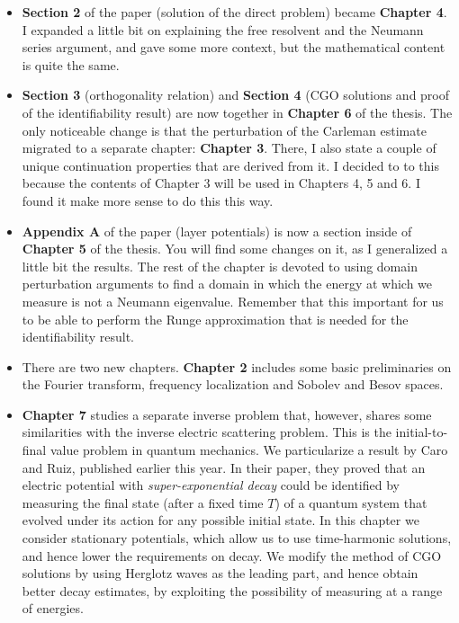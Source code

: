 \documentclass{article}
\begin{document}
\begin{itemize}
	\item \textbf{Section 2} of the paper (solution of the direct problem) became \textbf{Chapter 4}. I expanded a little bit on explaining the free resolvent and the Neumann series argument, and gave some more context, but the mathematical content is quite the same.
	\item \textbf{Section 3} (orthogonality relation) and \textbf{Section 4} (CGO solutions and proof of the identifiability result) are now together in \textbf{Chapter 6} of the thesis. The only noticeable change is that the perturbation of the Carleman estimate migrated to a separate chapter: \textbf{Chapter 3}. There, I also state a couple of unique continuation properties that are derived from it. I decided to to this because the contents of Chapter 3 will be used in Chapters 4, 5 and 6. I found it make more sense to do this this way.
	\item \textbf{Appendix A} of the paper (layer potentials) is now a section inside of \textbf{Chapter 5} of the thesis. You will find some changes on it, as I generalized a little bit the results. The rest of the chapter is devoted to using domain perturbation arguments to find a domain in which the energy at which we measure is not a Neumann eigenvalue. Remember that this important for us to be able to perform the Runge approximation that is needed for the identifiability result.
	\item There are two new chapters. \textbf{Chapter 2} includes some basic preliminaries on the Fourier transform, frequency localization and Sobolev and Besov spaces. 
	\item \textbf{Chapter 7} studies a separate inverse problem that, however, shares some similarities with the inverse electric scattering problem. This is the initial-to-final value problem in quantum mechanics. We particularize a result by Caro and Ruiz, published earlier this year. In their paper, they proved that an electric potential with \textit{super-exponential decay} could be identified by measuring the final state (after a fixed time $T$) of a quantum system that evolved under its action for any possible initial state. In this chapter we consider stationary potentials, which allow us to use time-harmonic solutions, and hence lower the requirements on decay. We modify the method of CGO solutions by using Herglotz waves as the leading part, and hence obtain better decay estimates, by exploiting the possibility of measuring at a range of energies.
\end{itemize}
\end{document}
